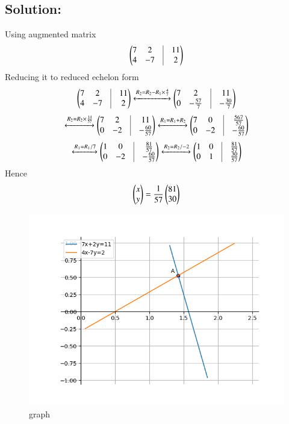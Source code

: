 \documentclass[journal]{IEEEtran}
\begin{document}
\subsection*{\textbf{Solution:}} 
Using augmented matrix
\begin{align}
   \myvec{7 & 2 &\vrule &11 \\
   4 & -7 &\vrule &2}
\end{align}
Reducing it to reduced echelon form
\begin{align}
    \myvec{7 & 2 &\vrule &11 \\
   4 & -7 &\vrule &2} \xleftrightarrow{R_2 = R_2- R_1\times \frac{4}{7}} \myvec{7 & 2 &\vrule &11 \\
   0 & -\frac{57}{7} &\vrule &-\frac{30}{7}}
\end{align}
\begin{align}
\xleftrightarrow{R_2=R_2\times \frac{14}{57}} \myvec{7 & 2 &\vrule &11 \\
   0 & -2 &\vrule &-\frac{60}{57}}
    \xleftrightarrow{R_1 = R_1+ R_2} \myvec{7 & 0 &\vrule &\frac{567}{57} \\
   0 & -2 &\vrule &-\frac{60}{57}} 
\end{align}
\begin{align}
    \xleftrightarrow{R_1 = R_1/7} \myvec{1 & 0 &\vrule &\frac{81}{57} \\
   0 & -2 &\vrule &-\frac{60}{57}} \xleftrightarrow{R_2 = R_2/-2} \myvec{1 & 0 &\vrule &\frac{81}{57} \\
   0 & 1 &\vrule &\frac{30}{57}} 
\end{align}
Hence 
\begin{align}
    \begin{pmatrix}x \\y\end{pmatrix} = \frac{1}{57} \begin{pmatrix}81\\30\end{pmatrix}
\end{align}
\newpage
\begin{figure}[H]
\centering
\includegraphics[width=0.7\columnwidth]{figs/fig.png} 
\caption{graph}
\label{}
\end{figure}
\end{document}
